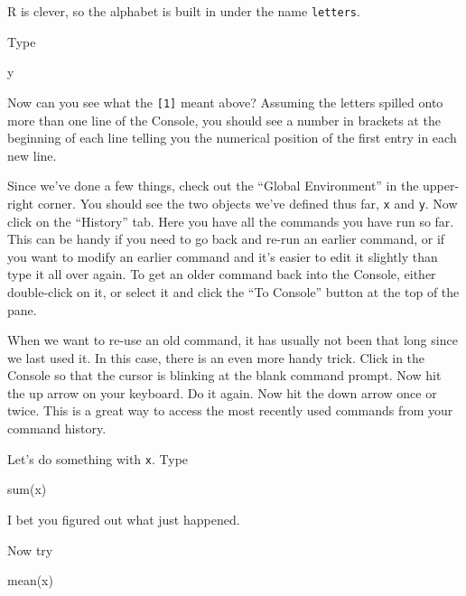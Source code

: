 \documentclass[
]{book}
\newenvironment{Shaded}{\begin{snugshade}}{\end{snugshade}}
\newcommand{\FunctionTok}[1]{\textcolor[rgb]{0.00,0.00,0.00}{#1}}
\newcommand{\NormalTok}[1]{#1}
\begin{document}
R is clever, so the alphabet is built in under the name \texttt{letters}.

Type

\begin{Shaded}
\begin{Highlighting}[]
\NormalTok{y}
\end{Highlighting}
\end{Shaded}

Now can you see what the \texttt{{[}1{]}} meant above? Assuming the letters spilled onto more than one line of the Console, you should see a number in brackets at the beginning of each line telling you the numerical position of the first entry in each new line.

Since we've done a few things, check out the ``Global Environment'' in the upper-right corner. You should see the two objects we've defined thus far, \texttt{x} and \texttt{y}. Now click on the ``History'' tab. Here you have all the commands you have run so far. This can be handy if you need to go back and re-run an earlier command, or if you want to modify an earlier command and it's easier to edit it slightly than type it all over again. To get an older command back into the Console, either double-click on it, or select it and click the ``To Console'' button at the top of the pane.

When we want to re-use an old command, it has usually not been that long since we last used it. In this case, there is an even more handy trick. Click in the Console so that the cursor is blinking at the blank command prompt. Now hit the up arrow on your keyboard. Do it again. Now hit the down arrow once or twice. This is a great way to access the most recently used commands from your command history.

Let's do something with \texttt{x}. Type

\begin{Shaded}
\begin{Highlighting}[]
\FunctionTok{sum}\NormalTok{(x)}
\end{Highlighting}
\end{Shaded}

I bet you figured out what just happened.

Now try

\begin{Shaded}
\begin{Highlighting}[]
\FunctionTok{mean}\NormalTok{(x)}
\end{Highlighting}
\end{Shaded}
\end{document}
